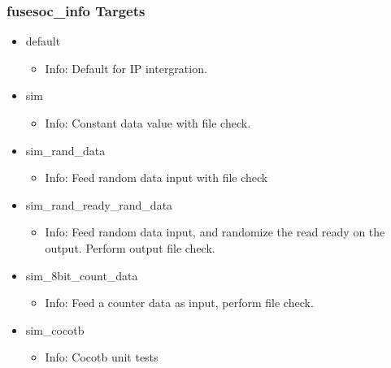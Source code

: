 \subsubsection{fusesoc\_info Targets}
\begin{itemize}
\item default
	\begin{itemize}
	\item[$\space$] Info: Default for IP intergration.
	\end{itemize}
\item sim
	\begin{itemize}
	\item[$\space$] Info: Constant data value with file check.
	\end{itemize}
\item sim\_rand\_data
	\begin{itemize}
	\item[$\space$] Info: Feed random data input with file check
	\end{itemize}
\item sim\_rand\_ready\_rand\_data
	\begin{itemize}
	\item[$\space$] Info: Feed random data input, and randomize the read ready on the output. Perform output file check.
	\end{itemize}
\item sim\_8bit\_count\_data
	\begin{itemize}
	\item[$\space$] Info: Feed a counter data as input, perform file check.
	\end{itemize}
\item sim\_cocotb
	\begin{itemize}
	\item[$\space$] Info: Cocotb unit tests
	\end{itemize}
\end{itemize}
